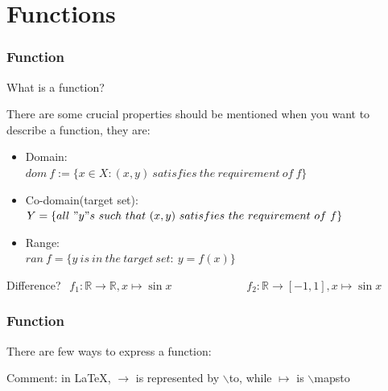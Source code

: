 \documentclass{beamer}
\begin{document}
\section{Functions}
\begin{frame}
    \frametitle{Function}
\begin{center}   
    What is a function?\\
\end{center}
 There are some crucial properties should be mentioned when you want to describe a function, they are:
\begin{itemize}
    \item Domain:\\
        $dom\ f:=\{x\in X: (x,y)\ satisfies\ the\ requirement\ of\ f\}$
    \item Co-domain(target set): \\
        $Y=\{all\ "y"s\ such\ that\ (x,y)\ satisfies\ the\ requirement\ of\ f\}$
    \item Range:\\
        $ran\ f=\{y\ is\ in\ the\ target\ set:\ y=f(x)\}$
\end{itemize}
\begin{block}{Difference?}
    $~~f_1: \mathbb{R} \to \mathbb{R}, x \mapsto \sin x~~~~~~~~~~~~~~~~~~~~~~~~~~~~~~f_2: \mathbb{R} \to [-1,1], x \mapsto \sin x$
\end{block}
\end{frame}
\begin{frame}
    \frametitle{Function}
There are few ways to express a function:
\vspace{2em}
\begin{table}
    \centering
\end{table}
\vspace{1em}
Comment: in \LaTeX, $\to$ is represented by $\backslash$to, while $\mapsto$ is $\backslash$mapsto
\end{frame}
\end{document}
